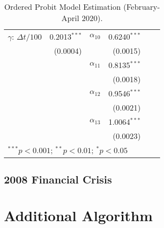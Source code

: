 \begin{table}[H]
\begin{center}
{\begin{tabular}{lrlrlr}
$\gamma$: \(\Delta t/100\) \tnote{a}& 0.2013$^{***}$ & $\alpha_{10}$ & 0.6240$^{***}$ & & \\
 & (0.0004) & & (0.0015) & & \\
 
 & & $\alpha_{11}$ & 0.8135$^{***}$ & & \\
 & & & (0.0018) & & \\
 
 & & $\alpha_{12}$ & 0.9546$^{***}$ & & \\
 & & & (0.0021) & & \\
 
 & & $\alpha_{13}$ & 1.0064$^{***}$ & & \\
 & & & (0.0023) & & \\
\bottomrule
\multicolumn{6}{l}{\scriptsize{$^{***}p<0.001$; $^{**}p<0.01$; $^{*}p<0.05$}}
\end{tabular}
}
\caption{Ordered Probit Model Estimation (February-April 2020).}
\label{tab:table-17}
\end{center}
\end{table}



\section{2008 Financial Crisis}





\chapter{Additional Algorithm}

